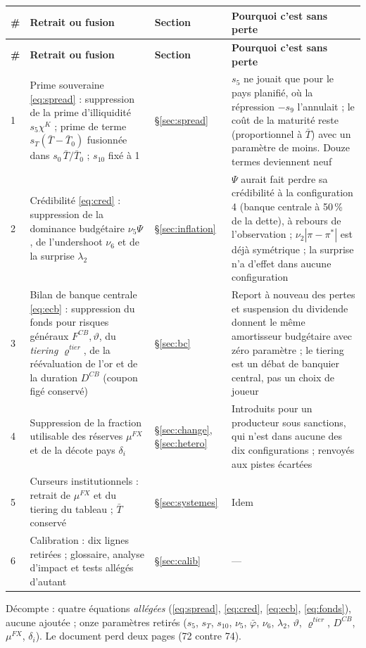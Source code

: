 \documentclass[11pt,a4paper]{article}
\begin{document}
\begin{center}\small
\begin{longtable}{p{0.5cm}p{6.4cm}p{2.2cm}p{5.8cm}}
\toprule
\textbf{\#} & \textbf{Retrait ou fusion} & \textbf{Section} & \textbf{Pourquoi c'est sans perte}\\
\midrule
\endfirsthead
\toprule
\textbf{\#} & \textbf{Retrait ou fusion} & \textbf{Section} & \textbf{Pourquoi c'est sans perte}\\
\midrule
\endhead
1 & Prime souveraine \eqref{eq:spread} : suppression de la prime d'illiquidité $s_5\chi^K$ ; prime de terme $s_T(\bar T-\bar T_0)$ fusionnée dans $s_0\,\bar T/\bar T_0$ ; $s_{10}$ fixé à 1 & \S\ref{sec:spread} & $s_5$ ne jouait que pour le pays planifié, où la répression $-s_9$ l'annulait ; le coût de la maturité reste (proportionnel à $\bar T$) avec un paramètre de moins. Douze termes deviennent neuf\\
2 & Crédibilité \eqref{eq:cred} : suppression de la dominance budgétaire $\nu_5\Psi$, de l'undershoot $\nu_6$ et de la surprise $\lambda_2$ & \S\ref{sec:inflation} & $\Psi$ aurait fait perdre sa crédibilité à la configuration 4 (banque centrale à 50\,\% de la dette), à rebours de l'observation ; $\nu_2|\pi-\pi^\ast|$ est déjà symétrique ; la surprise n'a d'effet dans aucune configuration\\
3 & Bilan de banque centrale \eqref{eq:ecb} : suppression du fonds pour risques généraux $F^{CB},\vartheta$, du \emph{tiering} $\varrho^{tier}$, de la réévaluation de l'or et de la duration $D^{CB}$ (coupon figé conservé) & \S\ref{sec:bc} & Report à nouveau des pertes et suspension du dividende donnent le même amortisseur budgétaire avec zéro paramètre ; le tiering est un débat de banquier central, pas un choix de joueur\\
4 & Suppression de la fraction utilisable des réserves $\mu^{FX}$ et de la décote pays $\delta_i$ & \S\ref{sec:change}, \S\ref{sec:hetero} & Introduits pour un producteur sous sanctions, qui n'est dans aucune des dix configurations ; renvoyés aux pistes écartées\\
5 & Curseurs institutionnels : retrait de $\mu^{FX}$ et du tiering du tableau ; $\bar T$ conservé & \S\ref{sec:systemes} & Idem\\
6 & Calibration : dix lignes retirées ; glossaire, analyse d'impact et tests allégés d'autant & \S\ref{sec:calib} & ---\\
\bottomrule
\end{longtable}
\end{center}
Décompte : quatre équations \emph{allégées} (\eqref{eq:spread}, \eqref{eq:cred}, \eqref{eq:ecb}, \eqref{eq:fonds}), aucune ajoutée ; onze paramètres retirés ($s_5$, $s_T$, $s_{10}$, $\nu_5$, $\bar\varphi$, $\nu_6$, $\lambda_2$, $\vartheta$, $\varrho^{tier}$, $D^{CB}$, $\mu^{FX}$, $\delta_i$). Le document perd deux pages (72 contre 74).
\end{document}
